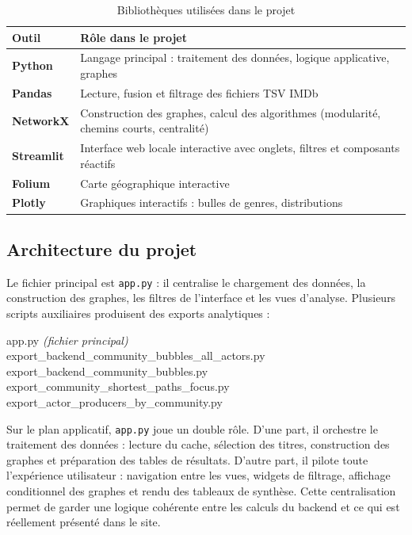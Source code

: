 \documentclass[a4paper,12pt]{article}
\newcommand{\file}[1]{\texttt{\color{imdbblue}#1}}
\begin{document}
\begin{table}[H]
\centering
\small
\setlength{\extrarowheight}{3pt}
\begin{tabularx}{\linewidth}{>{\bfseries\color{imdbblue}}l X}
\toprule
\rowcolor{imdblight}
Outil & Rôle dans le projet \\
\midrule
Python & Langage principal : traitement des données, logique applicative, graphes \\
Pandas & Lecture, fusion et filtrage des fichiers TSV IMDb \\
NetworkX & Construction des graphes, calcul des algorithmes (modularité, chemins courts, centralité) \\
Streamlit & Interface web locale interactive avec onglets, filtres et composants réactifs \\
Folium & Carte géographique interactive \\
Plotly & Graphiques interactifs : bulles de genres, distributions \\
\bottomrule
\end{tabularx}
\caption{Bibliothèques utilisées dans le projet}
\end{table}

\subsection{Architecture du projet}

Le fichier principal est \file{app.py} : il centralise le chargement des données, la construction des graphes, les filtres de l'interface et les vues d'analyse. Plusieurs scripts auxiliaires produisent des exports analytiques :

\begin{tcolorbox}[codebox]
app.py \hfill\textit{(fichier principal)}\\
export\_backend\_community\_bubbles\_all\_actors.py\\
export\_backend\_community\_bubbles.py\\
export\_community\_shortest\_paths\_focus.py\\
export\_actor\_producers\_by\_community.py
\end{tcolorbox}

Sur le plan applicatif, \file{app.py} joue un double rôle. D'une part, il orchestre le traitement des données : lecture du cache, sélection des titres, construction des graphes et préparation des tables de résultats. D'autre part, il pilote toute l'expérience utilisateur : navigation entre les vues, widgets de filtrage, affichage conditionnel des graphes et rendu des tableaux de synthèse. Cette centralisation permet de garder une logique cohérente entre les calculs du backend et ce qui est réellement présenté dans le site.
\newpage
\end{document}
